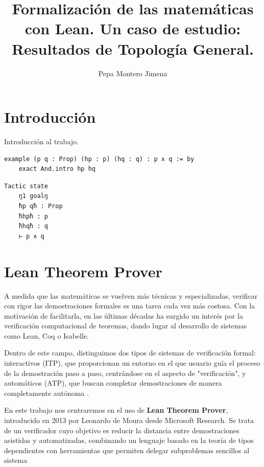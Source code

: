 \documentclass{article}
\title{Formalización de las matemáticas con Lean. Un caso de estudio: Resultados de Topología General.}
\author{Pepa Montero Jimena}
\date{}
\begin{document}
\maketitle
\tableofcontents


\section{Introducción}

Introducción al trabajo.



\noindent
\begin{minipage}[t]{0.58\textwidth}
\begin{lstlisting}[language=lean]
  example (p q : Prop) (hp : p) (hq : q) : p ∧ q := by
    exact And.intro hp hq
\end{lstlisting}
\end{minipage}%
\hfill
\begin{minipage}[t]{0.40\textwidth}
  \begin{lstlisting}[language=infoview]
  Tactic state
    ŋ1 goalŋ
    ħp qħ : Prop
    ħhpħ : p
    ħhqħ : q
    ⊢ p ∧ q\end{lstlisting}
\end{minipage}


\newpage

\section{Lean Theorem Prover}

A medida que las matemáticas se vuelven más técnicas y especializadas, verificar con rigor las demostraciones formales es una tarea cada vez más costosa. Con la motivación de facilitarla, en las últimas décadas ha surgido un interés por la verificación computacional de teoremas, dando lugar al desarrollo de sistemas como Lean, Coq o Isabelle.

Dentro de este campo, distinguimos dos tipos de sistemas de verificación formal: interactivos (ITP), que proporcionan un entorno en el que usuario guía el proceso de la demostración paso a paso, centrándose en el aspecto de "verificación", y automáticos (ATP), que buscan completar demostraciones de manera completamente autónoma \cite[Sección~1]{avigad2024theorem}.

En este trabajo nos centraremos en el uso de \textbf{Lean Theorem Prover}, introducido en 2013 por Leonardo de Moura desde Microsoft Research. Se trata de un verificador cuyo objetivo es reducir la distancia entre demostraciones asistidas y automatizadas, combinando un lenguaje basado en la teoría de tipos dependientes con herramientas que permiten delegar subproblemas sencillos al sistema
\end{document}
